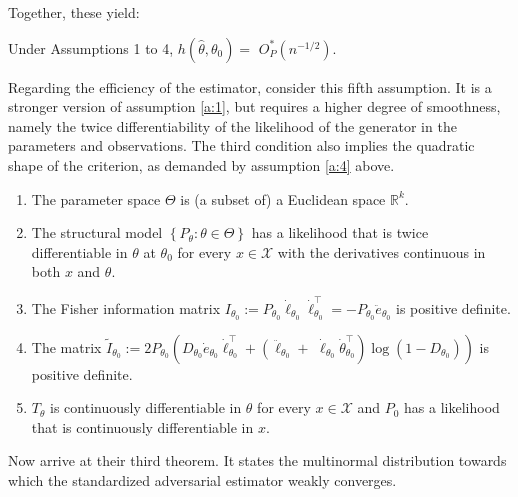 Together, these yield:
\begin{theorem}
\label{th:kmp_2}
    Under Assumptions 1 to 4, $h\left(\hat{\theta}, \theta_{0}\right)=$ $O_{P}^{*}\left(n^{-1 / 2}\right)$.
\end{theorem}

Regarding the efficiency of the estimator, consider this fifth assumption.
It is a stronger version of assumption \ref{a:1}, but requires a higher degree of smoothness, namely the twice differentiability of the likelihood of the generator in the parameters and observations.%
The third condition also implies the quadratic shape of the criterion, as demanded by assumption \ref{a:4} above. 
\begin{assumption}[A5, KMP]
\label{a:5}
    \begin{enumerate}
        \item The parameter space $\Theta$ is (a subset of) a Euclidean space $\mathbb{R}^{k}$. 
        \item The structural model $\left\{P_{\theta}: \theta \in \Theta\right\}$ has a likelihood that is twice differentiable in $\theta$ at $\theta_{0}$ for every $x \in \mathcal{X}$ with the derivatives continuous in both $x$ and $\theta$. 
        \item The Fisher information matrix $I_{\theta_{0}}:=P_{\theta_{0}} \dot{\ell}_{\theta_{0}} \dot{\ell}_{\theta_{0}}^{\top}=-P_{\theta_{0}} \ddot{e}_{\theta_{0}}$ is positive definite.
        \item The matrix $\tilde{I}_{\theta_{0}}:=2 P_{\theta_{0}}\left(D_{\theta_{0}} \dot{e}_{\theta_{0}} \dot{\ell}_{\theta_{0}}^{\top}+\left(\ddot{\ell}_{\theta_{0}}+\right.\right.$ $\left.\left.\dot{\ell}_{\theta_{0}} \dot{\theta}_{\theta_{0}}^{\top}\right) \log \left(1-D_{\theta_{0}}\right)\right)$ is positive definite.
        \item $T_{\theta}$ is continuously differentiable in $\theta$ for every $x \in \mathcal{X}$ and $P_{0}$ has a likelihood that is continuously differentiable in $x$.
    \end{enumerate}
\end{assumption}

Now \textcite{kaji2023adversarial} arrive at their third theorem.
It states the multinormal distribution towards which the standardized adversarial estimator weakly converges.
 
